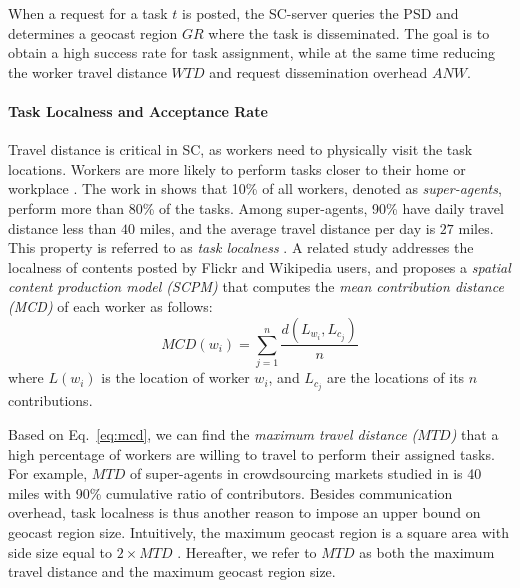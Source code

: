 \documentclass{USC-Thesis}
\numberwithin{equation}{chapter}
\begin{document}
When a request for a task $t$ is posted, the SC-server queries the PSD and determines a geocast region $\mathit{GR}$ where the task is disseminated. The goal is to obtain a high success rate for task assignment, while at the same time reducing the worker travel distance $\mathit{WTD}$ and request dissemination overhead $\mathit{ANW}$.

\paragraph{Task Localness and Acceptance Rate}
\label{sec:acceptance_rate}

Travel distance is critical in SC, as workers need to physically visit the task locations. Workers are more likely to perform tasks closer to their home or workplace \cite{musthag2013labor,kazemi2012geocrowd,alt2010location}. The work in \cite{musthag2013labor} shows that 10\% of all workers, denoted as {\em super-agents}, perform more than 80\% of the tasks. Among super-agents, 90\% have daily travel distance less than $40$ miles, and the average travel distance per day is $27$ miles. This property is referred to as \textit{task localness} \cite{kazemi2012geocrowd}. A related study \cite{hecht2010localness} addresses the localness of contents posted by Flickr and Wikipedia users, and proposes a {\em spatial content production model (SCPM)} that computes the \textit{mean contribution distance (MCD)} of each worker as follows:
\begin{equation}
\label{eq:mcd}
MCD(w_i) = \displaystyle \sum\limits_{j=1}^{n}\frac{d(L_{w_i},L_{c_j})}{n}
\end{equation}
where $L(w_i)$ is the location of worker $w_i$, and $L_{c_j}$ are the locations of its $n$ contributions.

Based on Eq.~\eqref{eq:mcd}, we can find the \textit{maximum travel distance ($\mathit{MTD}$)} that a high percentage of workers are willing to travel to perform their assigned tasks.
For example, $\mathit{MTD}$ of super-agents in crowdsourcing markets studied in \cite{musthag2013labor} is 40 miles with 90\% cumulative ratio of contributors. Besides communication overhead, task localness is thus another reason to impose an upper bound on geocast region size. Intuitively, the maximum geocast region is a square area with side size equal to $2 \times \mathit{MTD}$ . Hereafter, we refer to $\mathit{MTD}$ as both the maximum travel distance and the maximum geocast region size.
\end{document}
